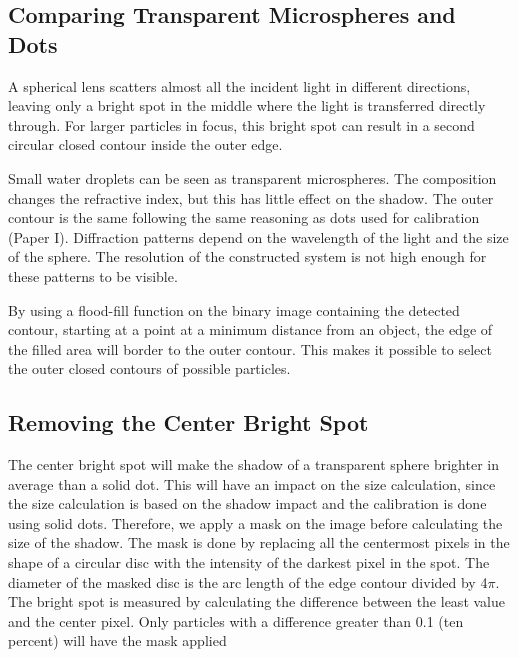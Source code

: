 \subsection{Comparing Transparent Microspheres and Dots}

A spherical lens scatters almost all the incident light in different directions, leaving only a bright spot in the middle where the light is transferred directly through. For larger particles in focus, this bright spot can result in a second circular closed contour inside the outer edge. 

Small water droplets can be seen as transparent microspheres. The composition changes the refractive index, but this has little effect on the shadow. The outer contour is the same following the same reasoning as dots used for calibration \cite{ryd2015}(Paper I). Diffraction patterns depend on the wavelength of the light and the size of the sphere. The resolution of the constructed system is not high enough for these patterns to be visible.

By using a flood-fill function on the binary image containing the detected contour, starting at a point at a minimum distance from an object, the edge of the filled area will border to the outer contour. This makes it possible to select the outer closed contours of possible particles.

\subsection{Removing the Center Bright Spot}

The center bright spot will make the shadow of a transparent sphere brighter in average than a solid dot. This will have an impact on the size calculation, since the size calculation is based on the shadow impact and the calibration is done using solid dots. Therefore, we apply a mask on the image before calculating the size of the shadow. The mask is done by replacing all the centermost pixels in the shape of a circular disc with the intensity of the darkest pixel in the spot. The diameter of the masked disc is the arc length of the edge contour divided by 4$\pi$. The bright spot is measured by calculating the difference between the least value and the center pixel. Only particles with a difference greater than 0.1 (ten percent) will have the mask applied

